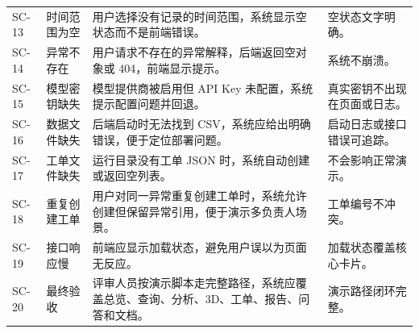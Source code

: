 \documentclass[12pt,a4paper]{ctexart}
\begin{document}
\begin{longtable}{L{1.6cm}L{3.0cm}L{6.2cm}L{4.4cm}}
SC-13 & 时间范围为空 & 用户选择没有记录的时间范围，系统显示空状态而不是前端错误。 & 空状态文字明确。 \\
SC-14 & 异常不存在 & 用户请求不存在的异常解释，后端返回空对象或 404，前端显示提示。 & 系统不崩溃。 \\
SC-15 & 模型密钥缺失 & 模型提供商被启用但 API Key 未配置，系统提示配置问题并回退。 & 真实密钥不出现在页面或日志。 \\
SC-16 & 数据文件缺失 & 后端启动时无法找到 CSV，系统应给出明确错误，便于定位部署问题。 & 启动日志或接口错误可追踪。 \\
SC-17 & 工单文件缺失 & 运行目录没有工单 JSON 时，系统自动创建或返回空列表。 & 不会影响正常演示。 \\
SC-18 & 重复创建工单 & 用户对同一异常重复创建工单时，系统允许创建但保留异常引用，便于演示多负责人场景。 & 工单编号不冲突。 \\
SC-19 & 接口响应慢 & 前端应显示加载状态，避免用户误以为页面无反应。 & 加载状态覆盖核心卡片。 \\
SC-20 & 最终验收 & 评审人员按演示脚本走完整路径，系统应覆盖总览、查询、分析、3D、工单、报告、问答和文档。 & 演示路径闭环完整。 \\
\bottomrule
\end{longtable}
\end{document}
